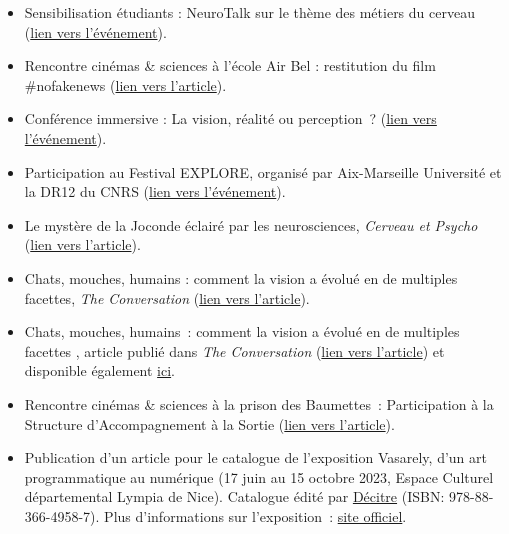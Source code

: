 \documentclass[10pt,french,a4paper,oneside]{article}%
\newcommand{\years}[1]{\marginpar{\textit{\scriptsize #1}}}
\begin{document}
\begin{itemize}
	\item Sensibilisation étudiants : \og{}NeuroTalk sur le thème des métiers du cerveau\fg{} (\href{https://laurentperrinet.github.io/post/2025-11-24_neurotalk/}{lien vers l'événement}). \years{2025}

	\item Rencontre cinémas \& sciences à l'école Air Bel : restitution du film \og{}\#nofakenews\fg{} (\href{https://laurentperrinet.github.io/post/2025-09-23_belair-nofakenews/}{lien vers l'article}). 
	
	\item Conférence immersive : \og{}La vision, réalité ou perception~?\fg{} (\href{https://laurentperrinet.github.io/talk/2025-06-12_explore-conference-immersive}{lien vers l'événement}).

	\item Participation au \og{}Festival EXPLORE\fg{}, organisé par Aix-Marseille Université et la DR12 du CNRS (\href{https://laurentperrinet.github.io/talk/2025-06-10_explore-cine-sciences}{lien vers l'événement}). 

	\item \og{}Le mystère de la Joconde éclairé par les neurosciences\fg{}, \textit{Cerveau et Psycho} (\href{https://laurentperrinet.github.io/post/2024-08-25-joconde/}{lien vers l'article}). \years{2024}

	\item \og{}Chats, mouches, humains : comment la vision a évolué en de multiples facettes\fg{}, \textit{The Conversation} (\href{https://laurentperrinet.github.io/publication/perrinet-24-yeux/}{lien vers l'article}). \years{2024}

    \item \og Chats, mouches, humains~: comment la vision a évolué en de multiples facettes \fg{}, article publié dans \textit{The Conversation} (\href{https://theconversation.com/le-jeu-du-cerveau-et-du-hasard-159388}{lien vers l'article}) et disponible également \href{https://laurentperrinet.github.io/publication/perrinet-24-yeux/}{ici}.

    \item Rencontre cinémas \& sciences à la prison des Baumettes~: Participation à la \og Structure d’Accompagnement à la Sortie \fg{} (\href{https://laurentperrinet.github.io/post/2024-05-23-lieux-fictifs/}{lien vers l'article}).

    \item Publication d’un article pour le catalogue de l’exposition \og Vasarely, d’un art programmatique au numérique \fg{} (17 juin au 15 octobre 2023, Espace Culturel départemental Lympia de Nice). Catalogue édité par \href{https://www.decitre.fr/livres/vasarely-9788836649587.html}{Décitre} (ISBN: 978-88-366-4958-7). Plus d’informations sur l’exposition~: \href{https://www.departement06.fr/culture/vasarely-d-un-art-programmatique-au-numerique-13667.html}{site officiel}. \years{2023}


\end{itemize}
\end{document}
